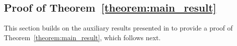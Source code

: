 % 
% 
% 
% 
\subsection{Proof of Theorem~\ref{theorem:main_result}}%
This section builds on the auxiliary results presented in  to provide a proof of Theorem~\ref{theorem:main_result}, which follows next.

